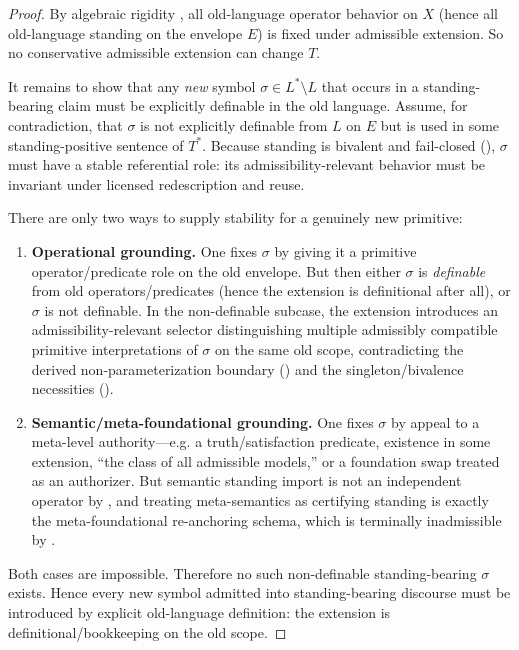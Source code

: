 \documentclass[11pt]{article}
\theoremstyle{definition}
\begin{document}
\begin{proof}
By algebraic rigidity , all old-language operator behavior on $X$ (hence all old-language standing on the envelope $E$) is fixed under admissible extension.
So no conservative admissible extension can change $T$.

It remains to show that any \emph{new} symbol $\sigma\in L^*\setminus L$ that occurs in a standing-bearing claim must be explicitly definable in the old language.
Assume, for contradiction, that $\sigma$ is not explicitly definable from $L$ on $E$ but is used in some standing-positive sentence of $T^*$.
Because standing is bivalent and fail-closed (), $\sigma$ must have a stable referential role: its admissibility-relevant behavior must be invariant under licensed redescription and reuse.

There are only two ways to supply stability for a genuinely new primitive:
\begin{enumerate}[label=\textbf{Case \arabic*:}, leftmargin=3.1em]
\item \textbf{Operational grounding.} One fixes $\sigma$ by giving it a primitive operator/predicate role on the old envelope.
But then either $\sigma$ is \emph{definable} from old operators/predicates (hence the extension is definitional after all), or $\sigma$ is not definable.
In the non-definable subcase, the extension introduces an admissibility-relevant selector distinguishing multiple admissibly compatible primitive interpretations of $\sigma$ on the same old scope, contradicting the derived non-parameterization boundary () and the singleton/bivalence necessities ().
\item \textbf{Semantic/meta-foundational grounding.} One fixes $\sigma$ by appeal to a meta-level authority---e.g. a truth/satisfaction predicate, existence in some extension, ``the class of all admissible models,'' or a foundation swap treated as an authorizer.
But semantic standing import is not an independent operator by , and treating meta-semantics as certifying standing is exactly the meta-foundational re-anchoring schema, which is terminally inadmissible by .
\end{enumerate}

Both cases are impossible.
Therefore no such non-definable standing-bearing $\sigma$ exists.
Hence every new symbol admitted into standing-bearing discourse must be introduced by explicit old-language definition: the extension is definitional/bookkeeping on the old scope.
\end{proof}
\end{document}
